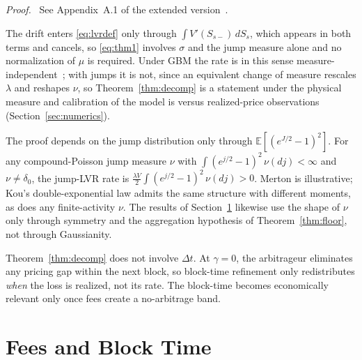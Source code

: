 \documentclass[runningheads]{llncs}
\newcommand{\E}{\mathbb{E}}
\newcommand{\dt}{\Delta t}
\newcommand{\1}{\mathbf{1}}
\newif\ifextended
\newcommand{\deferproof}[1]{%
  \par\smallskip\noindent\textit{Proof.}\ \ifextended
  See Appendix~#1.\else
  See Appendix~#1 of the extended version~\cite{bundi2026ext}.\fi\par\smallskip}
\begin{document}
\deferproof{A.1}

\begin{remark}[Measure]\label{rem:measure}
The drift enters \eqref{eq:lvrdef} only through $\int V'(S_{s-})\,dS_s$, which appears in both terms and cancels, so \eqref{eq:thm1} involves $\sigma$ and the jump measure alone and no normalization of $\mu$ is required. Under GBM the rate is in this sense measure-independent~\cite{milionis2022automated}; with jumps it is not, since an equivalent change of measure rescales $\lambda$ and reshapes $\nu$, so Theorem~\ref{thm:decomp} is a statement under the physical measure and calibration of the model is versus realized-price observations (Section~\ref{sec:numerics}).
\end{remark}

\begin{remark}\label{rem:generaljumps}
The proof depends on the jump distribution only through $\E[(e^{J/2}-1)^2]$. For any compound-Poisson jump measure $\nu$ with $\int (e^{j/2}-1)^2\,\nu(dj) < \infty$ and $\nu \neq \delta_0$, the jump-LVR rate is $\tfrac{\lambda V}{2}\int (e^{j/2}-1)^2\,\nu(dj) > 0$. Merton is illustrative; Kou's double-exponential law admits the same structure with different moments, as does any finite-activity $\nu$. The results of Section~\ref{sec:fees} likewise use the shape of $\nu$ only through symmetry and the aggregation hypothesis of Theorem~\ref{thm:floor}, not through Gaussianity.
\end{remark}

\begin{remark}\label{rem:dtinvariant}
Theorem~\ref{thm:decomp} does not involve $\dt$. At $\gamma=0$, the arbitrageur eliminates any pricing gap within the next block, so block-time refinement only redistributes \emph{when} the loss is realized, not its rate. The block-time becomes economically relevant only once fees create a no-arbitrage band.
\end{remark}

\section{Fees and Block Time}\label{sec:fees}
\end{document}
